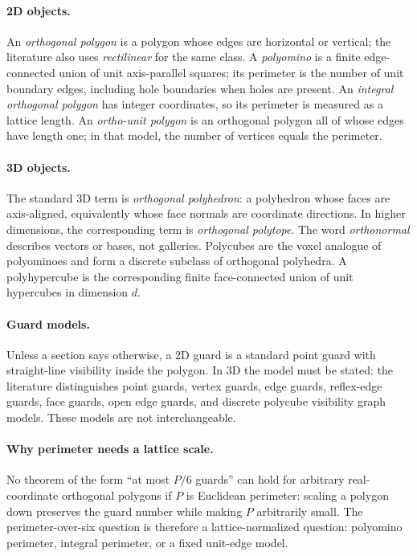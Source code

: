 \documentclass[11pt]{article}
\begin{document}
\paragraph{2D objects.}
An \emph{orthogonal polygon} is a polygon whose edges are horizontal or
vertical; the literature also uses \emph{rectilinear} for the same class.  A
\emph{polyomino} is a finite edge-connected union of unit axis-parallel
squares; its perimeter is the number of unit boundary edges, including hole
boundaries when holes are present.  An \emph{integral orthogonal polygon} has
integer coordinates, so its perimeter is measured as a lattice length.  An
\emph{ortho-unit polygon} is an orthogonal polygon all of whose edges have
length one; in that model, the number of vertices equals the perimeter.

\paragraph{3D objects.}
The standard 3D term is \emph{orthogonal polyhedron}: a polyhedron whose faces
are axis-aligned, equivalently whose face normals are coordinate directions.
In higher dimensions, the corresponding term is \emph{orthogonal polytope}.
The word \emph{orthonormal} describes vectors or bases, not galleries.
Polycubes are the voxel analogue of polyominoes and form a discrete subclass
of orthogonal polyhedra.  A polyhypercube is the corresponding finite
face-connected union of unit hypercubes in dimension $d$.

\paragraph{Guard models.}
Unless a section says otherwise, a 2D guard is a standard point guard with
straight-line visibility inside the polygon.  In 3D the model must be stated:
the literature distinguishes point guards, vertex guards, edge guards,
reflex-edge guards, face guards, open edge guards, and discrete polycube
visibility graph models.  These models are not interchangeable.

\paragraph{Why perimeter needs a lattice scale.}
No theorem of the form ``at most $P/6$ guards'' can hold for arbitrary
real-coordinate orthogonal polygons if $P$ is Euclidean perimeter: scaling a
polygon down preserves the guard number while making $P$ arbitrarily small.
The perimeter-over-six question is therefore a lattice-normalized question:
polyomino perimeter, integral perimeter, or a fixed unit-edge model.
\end{document}
